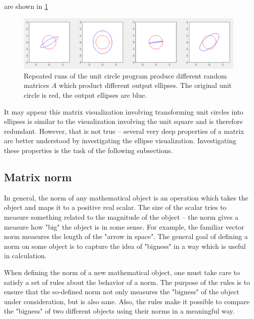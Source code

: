 \documentclass[onefignum,onetabnum]{siamart190516}
\begin{document}
are shown in \cref{fig:4Ellipses}
\begin{figure}[thb]
	\centering
	\includegraphics[width=1.0\columnwidth]{4Ellipses.png}
	\caption{Repeated runs of the unit circle program produce different random matrices $A$ which 
		product different output ellipses.  The original unit circle is red, the output ellipses are blue.}
	\label{fig:4Ellipses}
\end{figure}

It may appear this matrix visualization involving
transforming unit circles into ellipses is similar to the
visualization involving the unit square and is therefore redundant.  
However, that is not true -- several very deep properties of a matrix are
better understood by investigating the ellipse
visualization.  Investigating these properties is the task of the following subsections.

\subsection{Matrix norm}
In general, the norm of any mathematical object 
is an operation which takes the object and maps it
to a positive real scalar.  The size of the scalar tries to measure something
related to the magnitude of the object -- the norm gives a measure how
"big" the object is in some sense.  
For example, the familiar vector norm measures
the length of the "arrow in space".  The general goal of defining a norm on some
object is to capture the idea of "bigness" in a way which is useful
in calculation.

When defining the norm of a new mathematical object, one must take
care to satisfy a set of rules about the behavior of a norm.
The purpose of the rules is to ensure
that the so-defined norm not only measures the
"bigness" of the object under consideration, but is also sane.  
Also, the rules make it possible to compare
the "bigness" of two different objects using their norms in a
meaningful way.
\end{document}
